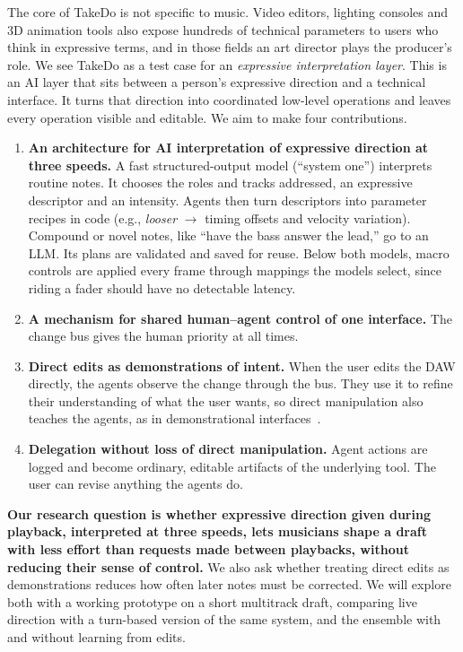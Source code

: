\documentclass[sigconf,nonacm]{acmart}
\newcommand{\projectname}{TakeDo}
\begin{document}
The core of \projectname{} is not specific to music. Video editors, lighting consoles and 3D animation tools also expose hundreds of technical parameters to users who think in expressive terms, and in those fields an art director plays the producer's role. We see \projectname{} as a test case for an \emph{expressive interpretation layer}. This is an AI layer that sits between a person's expressive direction and a technical interface. It turns that direction into coordinated low-level operations and leaves every operation visible and editable. We aim to make four contributions.
\begin{enumerate}
  \item \textbf{An architecture for AI interpretation of expressive direction at three speeds.} A fast structured-output model (``system one'') interprets routine notes. It chooses the roles and tracks addressed, an expressive descriptor and an intensity. Agents then turn descriptors into parameter recipes in code (e.g., \emph{looser} $\rightarrow$ timing offsets and velocity variation). Compound or novel notes, like ``have the bass answer the lead,'' go to an LLM. Its plans are validated and saved for reuse. Below both models, macro controls are applied every frame through mappings the models select, since riding a fader should have no detectable latency.
  \item \textbf{A mechanism for shared human--agent control of one interface.} The change bus gives the human priority at all times.
  \item \textbf{Direct edits as demonstrations of intent.} When the user edits the DAW directly, the agents observe the change through the bus. They use it to refine their understanding of what the user wants, so direct manipulation also teaches the agents, as in demonstrational interfaces~\cite{myers1992demonstrational}.
  \item \textbf{Delegation without loss of direct manipulation.} Agent actions are logged and become ordinary, editable artifacts of the underlying tool. The user can revise anything the agents do.
\end{enumerate}

\textbf{Our research question is whether expressive direction given during playback, interpreted at three speeds, lets musicians shape a draft with less effort than requests made between playbacks, without reducing their sense of control.} We also ask whether treating direct edits as demonstrations reduces how often later notes must be corrected. We will explore both with a working prototype on a short multitrack draft, comparing live direction with a turn-based version of the same system, and the ensemble with and without learning from edits.
\end{document}
